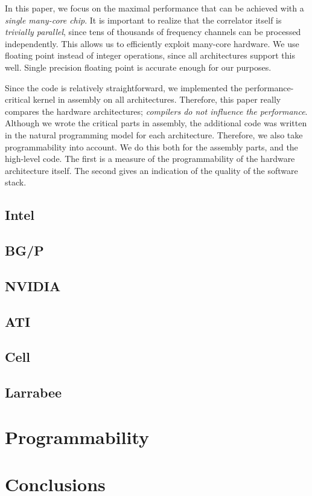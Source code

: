 \documentclass{article}
\begin{document}
In this paper, we  focus on the maximal performance that can be achieved
with a \emph{single many-core chip}.  It is important to realize that the
correlator itself is \emph{trivially parallel}, since tens of thousands of
frequency channels can be processed independently.  This allows us to
efficiently exploit many-core hardware. We use floating point instead
of integer operations, since all architectures support this
well. Single precision floating point is accurate enough for our
purposes.

Since the code is relatively straightforward, we implemented the
performance-critical kernel in assembly on all
architectures. Therefore, this paper really compares the hardware
architectures; \emph{compilers do not influence the
  performance}. Although we wrote the critical parts in assembly, the
additional code was written in the natural programming model for each
architecture. Therefore, we also take programmability into
account.
We do this both for the assembly parts, and the high-level code.
The first is a measure of the programmability of the hardware architecture itself.
The second gives an indication of the quality of the software stack.






\subsection{Intel}
\subsection{BG/P}
\subsection{NVIDIA}
\subsection{ATI}
\subsection{Cell}
\subsection{Larrabee}

 
\section{Programmability}


\section{Conclusions}




\end{document}
